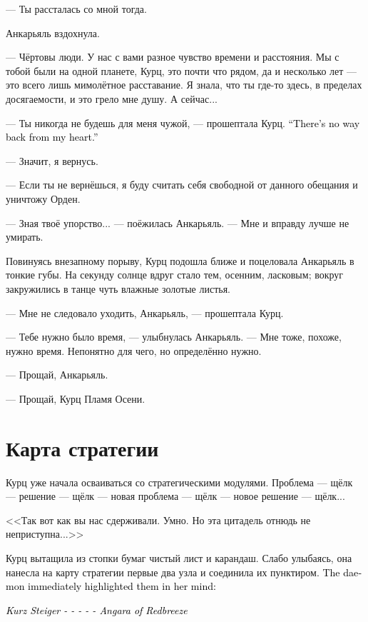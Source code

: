 \documentclass[a4paper,10pt,fleqn]{book}\usepackage{polyglossia}\setdefaultlanguage{english}\setotherlanguage{russian}\defaultfontfeatures{Ligatures=TeX,Mapping=tex-text}\usepackage{xcolor}\definecolor{lightgray}{HTML}{bbbbbb}\color{lightgray}\newcommand{\ml}[3]{\textcolor{black}{#3}}
\begin{document}
--- Ты рассталась со мной тогда.

Анкарьяль вздохнула.

--- Чёртовы люди.
У нас с вами разное чувство времени и расстояния.
Мы с тобой были на одной планете, Курц, это почти что рядом, да и несколько лет --- это всего лишь мимолётное расставание.
Я знала, что ты где-то здесь, в пределах досягаемости, и это грело мне душу.
А сейчас...

--- Ты никогда не будешь для меня чужой, --- прошептала Курц.
\ml{$0$}
{--- Из моего сердца обратной дороги нет.}
{``There's no way back from my heart.''}

--- Значит, я вернусь.

--- Если ты не вернёшься, я буду считать себя свободной от данного обещания и уничтожу Орден.

--- Зная твоё упорство... --- поёжилась Анкарьяль.
--- Мне и вправду лучше не умирать.

Повинуясь внезапному порыву, Курц подошла ближе и поцеловала Анкарьяль в тонкие губы.
На секунду солнце вдруг стало тем, осенним, ласковым;
вокруг закружились в танце чуть влажные золотые листья.

--- Мне не следовало уходить, Анкарьяль, --- прошептала Курц.

--- Тебе нужно было время, --- улыбнулась Анкарьяль.
--- Мне тоже, похоже, нужно время.
Непонятно для чего, но определённо нужно.

--- Прощай, Анкарьяль.

--- Прощай, Курц Пламя Осени.

\section{Карта стратегии}

Курц уже начала осваиваться со стратегическими модулями.
Проблема --- щёлк --- решение --- щёлк --- новая проблема --- щёлк --- новое решение --- щёлк...

<<Так вот как вы нас сдерживали.
Умно.
Но эта цитадель отнюдь не неприступна...>>

Курц вытащила из стопки бумаг чистый лист и карандаш.
Слабо улыбаясь, она нанесла на карту стратегии первые два узла и соединила их пунктиром.
\ml{$0$}
{Демон тут же подсветил их в её сознании:}
{The daemon immediately highlighted them in her mind:}

\ml{$0$}
{<<Курц Штайгер - - - - - Ангара Краснобуря>>}
{\textit{Kurz Steiger - - - - - Angara of Redbreeze}}
\end{document}
